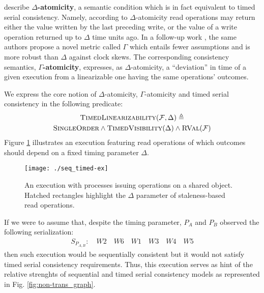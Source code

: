 \documentclass[letter, 11pt]{article}
\newcommand{\RVAL}{\textsc{RVal}(\mathcal{F})}
\newcommand{\citeN}{\citet}
\renewcommand{\cite}{\citep}
\begin{document}
\noindent \citeN{Golab.Li.ea:11} describe \textbf{$\Delta$-atomicity}, a semantic condition which is in fact equivalent to timed serial consistency.
Namely, according to $\Delta$-atomicity read operations may return either the value written by the last preceding write, or the value of a write operation returned up to $\Delta$ time units ago. 
In a follow-up work \cite{Golab.ea:14}, the same authors propose a novel metric called $\Gamma$ which entails fewer assumptions and is more robust than $\Delta$ against clock skews.
The corresponding consistency semantics, \textbf{$\Gamma$-atomicity}, expresses, as $\Delta$-atomicity,
a ``deviation'' in time of a given execution from a linearizable one having the same operations' outcomes.

\noindent We express the core notion of  $\Delta$-atomicity, $\Gamma$-atomicity and timed serial consistency in the following
predicate:
\begin{multline}
\textsc{TimedLinearizability}(\mathcal{F}, \Delta) \triangleq 
\\ \textsc{SingleOrder} \wedge \textsc{TimedVisibility}(\Delta) \wedge \RVAL
\end{multline}
Figure \ref{fig:seq_timed-ex} illustrates an execution featuring read operations of which outcomes should 
depend on a fixed timing parameter $\Delta$.
\begin{figure}[h]
	\centering
	\texttt{[image: ./seq\_timed-ex]} 	\caption{An execution with processes issuing operations on a shared object.\\
	Hatched rectangles highlight the $\Delta$ parameter of staleness-based read operations.}
	\label{fig:seq_timed-ex}
\end{figure}

\noindent If we were to assume that, despite the timing parameter, $P_A$ and $P_B$ observed the following serialization:
\begin{align} 
S_{P_{A,B}} : \quad W2 \quad W6 \quad W1 \quad W3 \quad W4 \quad W5 \tag{S.10}
\end{align}
then such execution would be sequentially consistent but it would not satisfy timed serial consistency requirements.
Thus, this execution serves as hint of the relative strenghts of sequential and timed serial consistency models as
represented in Fig. \ref{fig:non-trans_graph}.
\end{document}
